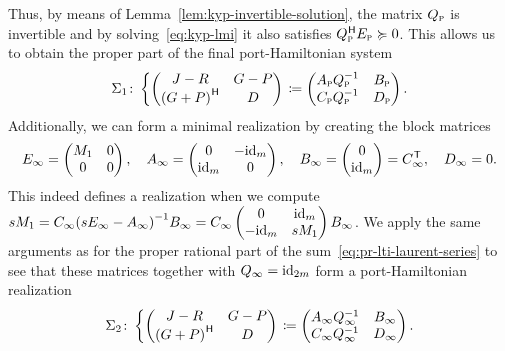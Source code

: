 Thus, by means of Lemma~\ref{lem:kyp-invertible-solution}, the matrix $Q_\msc{p}$ is invertible and by solving~\eqref{eq:kyp-lmi} it also satisfies $Q_\msc{p}\herm E_\msc{p} \succcurlyeq 0$.
This allows us to obtain the proper part of the final port-Hamiltonian system
\begin{equation}\label{eq:pr-proper-ph-part}
    \Sigma_1 \colon \left\lbrace
    \begin{pmatrix}
        J - R & G - P \\
        {(G + P)}\herm & D
    \end{pmatrix}
    \right. \coloneqq \begin{pmatrix}
        A_\msc{p} Q_\msc{p}\inv & B_\msc{p} \\
        C_\msc{p} Q_\msc{p}\inv & D_\msc{p}
    \end{pmatrix}.
\end{equation}
Additionally, we can form a minimal realization by creating the block matrices
\begin{equation*}
    E_\infty = \begin{pmatrix}
        M_1 & 0 \\
        0 & 0
    \end{pmatrix},\quad A_\infty = \begin{pmatrix}
        0 & -\id[m] \\
        \id[m] & 0
    \end{pmatrix},\quad B_\infty = \begin{pmatrix}
        0 \\
        \id[m]
    \end{pmatrix} = C_\infty\trans,\quad D_\infty = 0.
\end{equation*}
This indeed defines a realization when we compute $s M_1 = C_\infty {(s E_\infty - A_\infty)}\inv B_\infty = C_\infty \begin{pmatrix}
    0 & \id[m] \\
    -\id[m] & s M_1
\end{pmatrix} B_\infty$.
We apply the same arguments as for the proper rational part of the sum~\eqref{eq:pr-lti-laurent-series} to see that these matrices together with $Q_\infty = \id[2m]$ form a port-Hamiltonian realization
\begin{equation}\label{eq:pr-improper-ph-part}
    \Sigma_2 \colon \left\lbrace
    \begin{pmatrix}
        J - R & G - P \\
        {(G + P)}\herm & D
    \end{pmatrix}
    \right. \coloneqq \begin{pmatrix}
        A_\infty Q_\infty\inv & B_\infty \\
        C_\infty Q_\infty\inv & D_\infty
    \end{pmatrix}.
\end{equation}
